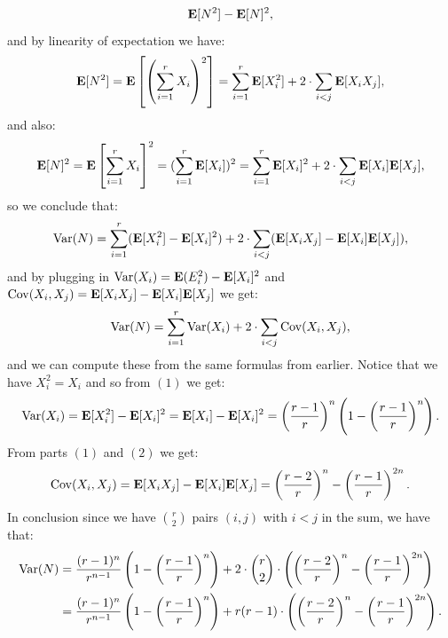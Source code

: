 \documentclass[11pt,a4paper]{article}
\begin{document}
\begin{solution}
\begin{enumerate}
\[        \mathbf{E}[N^2] - \mathbf{E}[N]^2,
      \]
      and by linearity of expectation we have:
      \[
        \E[N^2] =
        \E\left[\del{\sum_{i=1}^{r} X_i}^2\right] =
        \sum_{i=1}^{r} \E[X_i^2] + 2 \cdot \sum_{i < j} \E[X_i X_j],
      \]
      and also:
      \[
        \mathbf{E}[N]^2 =
        \mathbf{E}\left[\sum_{i=1}^{r} X_i\right]^2 =
        (\sum_{i=1}^{r} \mathbf{E}[X_i])^2 =
        \sum_{i=1}^{r} \mathbf{E}[X_i]^2 + 2 \cdot \sum_{i < j} \mathbf{E}[X_i] \mathbf{E}[X_j],
      \]
      so we conclude that:
      \[
        \operatorname{Var}(N) =
        \sum_{i=1}^{r} (\mathbf{E}[X_i^2] - \mathbf{E}[X_i]^2) +
        2 \cdot \sum_{i < j} (\mathbf{E}[X_i X_j] - \mathbf{E}[X_i] \mathbf{E}[X_j]),
      \]
      and by plugging in $\operatorname{Var}(X_i) = \mathbf{E}(E_i^2) - \mathbf{E}[X_i]^2$
      and $\operatorname{Cov}(X_i,X_j) = \mathbf{E}[X_i X_j] - \mathbf{E}[X_i] \mathbf{E}[X_j]$ we get:
      \[
        \operatorname{Var}(N) = 
        \sum_{i=1}^{r} \operatorname{Var}(X_i) +
        2 \cdot \sum_{i < j} \operatorname{Cov}(X_i,X_j),
      \]
      and we can compute these from the same formulas from earlier.
      Notice that we have $X_i^2 = X_i$ and so from $(1)$ we get:
      \[
        \Var(X_i) =
        \E[X_i^2] - \E[X_i]^2 =
        \E[X_i] - \E[X_i]^2 =
        \del{\frac{r - 1}{r}}^n \del{1 - \del{\frac{r - 1}{r}}^n}.
      \]
      From parts $(1)$ and $(2)$ we get:
      \[
        \Cov(X_i,X_j) =
        \E[X_i X_j] - \E[X_i] \E[X_j] =
        \del{\frac{r - 2}{r}}^n - \del{\frac{r - 1}{r}}^{2n}.
      \]
      In conclusion since we have $\binom{r}{2}$ pairs $(i,j)$ with $i < j$
      in the sum, we have that:
      \begin{align*}
        \Var(N) &= 
        \frac{(r - 1)^n}{r^{n-1}} \del{1 - \del{\frac{r - 1}{r}}^n} +
        2 \cdot \binom{r}{2} \cdot 
        \del{\del{\frac{r - 2}{r}}^n - \del{\frac{r - 1}{r}}^{2n}} \\ &=
        \frac{(r - 1)^n}{r^{n-1}} \del{1 - \del{\frac{r - 1}{r}}^n} +
        r (r - 1) \cdot 
        \del{\del{\frac{r - 2}{r}}^n - \del{\frac{r - 1}{r}}^{2n}}.
      \end{align*}
  \end{enumerate}
\end{solution}
\end{document}
